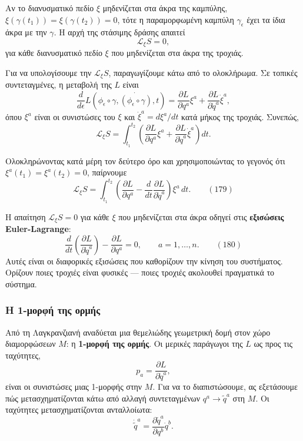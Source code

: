 \documentclass[12pt]{article}
\begin{document}
Αν το διανυσματικό πεδίο $\xi$ μηδενίζεται στα άκρα της καμπύλης, $\xi(\gamma(t_1)) = \xi(\gamma(t_2)) = 0$, τότε η παραμορφωμένη καμπύλη $\gamma_\epsilon$ έχει τα ίδια άκρα με την $\gamma$. Η αρχή της στάσιμης δράσης απαιτεί
\[
\mathcal{L}_\xi S = 0,
\]
για κάθε διανυσματικό πεδίο $\xi$ που μηδενίζεται στα άκρα της τροχιάς.

Για να υπολογίσουμε την $\mathcal{L}_\xi S$, παραγωγίζουμε κάτω από το ολοκλήρωμα. Σε τοπικές συντεταγμένες, η μεταβολή της $L$ είναι
\[
\frac{d}{d\epsilon} L(\phi_\epsilon \circ \gamma, \dot{(\phi_\epsilon \circ \gamma)}, t) = \frac{\partial L}{\partial q^a} \xi^a + \frac{\partial L}{\partial \dot{q}^a} \dot{\xi}^a,
\]
όπου $\xi^a$ είναι οι συνιστώσες του $\xi$ και $\dot{\xi}^a = d\xi^a/dt$ κατά μήκος της τροχιάς. Συνεπώς,
\[
\mathcal{L}_\xi S = \int_{t_1}^{t_2} \left( \frac{\partial L}{\partial q^a} \xi^a + \frac{\partial L}{\partial \dot{q}^a} \dot{\xi}^a \right) dt.
\]

Ολοκληρώνοντας κατά μέρη τον δεύτερο όρο και χρησιμοποιώντας το γεγονός ότι $\xi^a(t_1) = \xi^a(t_2) = 0$, παίρνουμε
\begin{equation}
\mathcal{L}_\xi S = \int_{t_1}^{t_2} \left( \frac{\partial L}{\partial q^a} - \frac{d}{dt} \frac{\partial L}{\partial \dot{q}^a} \right) \xi^a \, dt. \qquad (179)
\end{equation}

Η απαίτηση $\mathcal{L}_\xi S = 0$ για κάθε $\xi$ που μηδενίζεται στα άκρα οδηγεί στις \textbf{εξισώσεις Euler-Lagrange}:
\begin{equation}
\frac{d}{dt} \left( \frac{\partial L}{\partial \dot{q}^a} \right) - \frac{\partial L}{\partial q^a} = 0, \qquad a = 1, \dots, n. \qquad (180)
\end{equation}
Αυτές είναι οι διαφορικές εξισώσεις που καθορίζουν την κίνηση του συστήματος. Ορίζουν ποιες τροχιές είναι φυσικές — ποιες τροχιές ακολουθεί πραγματικά το σύστημα.

\subsubsection{Η 1-μορφή της ορμής}

Από τη Λαγκρανζιανή αναδύεται μια θεμελιώδης γεωμετρική δομή στον χώρο διαμορφώσεων $M$: η \textbf{1-μορφή της ορμής}. Οι μερικές παράγωγοι της $L$ ως προς τις ταχύτητες,
\[
p_a = \frac{\partial L}{\partial \dot{q}^a},
\]
είναι οι συνιστώσες μιας 1-μορφής στην $M$. Για να το διαπιστώσουμε, ας εξετάσουμε πώς μετασχηματίζονται κάτω από αλλαγή συντεταγμένων $q^a \to \tilde{q}^a$ στη $M$. Οι ταχύτητες μετασχηματίζονται ανταλλοίωτα:
\[
\dot{\tilde{q}}^a = \frac{\partial \tilde{q}^a}{\partial q^b} \dot{q}^b.
\]
\end{document}
